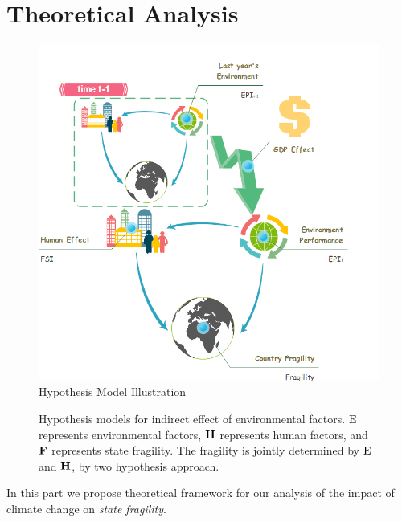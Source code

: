 \section{Theoretical Analysis}
\label{sec:model1}

\begin{figure}[t]
    \centering
   \includegraphics[width=.8\linewidth]{figs/model} 
   \caption{Hypothesis Model Illustration}
   \label{fig:model:model}
\end{figure}

\begin{figure}[t]
   \centering
   \caption{Hypothesis models for indirect effect of environmental factors. $\operatorname*{E}$ represents environmental factors, $\operatorname*{\mathbf{H}}$ represents human factors, and $\operatorname*{\mathbf{F}}$ represents state fragility. The fragility is jointly determined by $\operatorname*{E}$ and $\operatorname*{\mathbf{H}}$, by two hypothesis approach.}
\end{figure}
\label{sec:model}
In this part we propose theoretical framework for our analysis of the impact of climate change on \emph{state fragility}.
